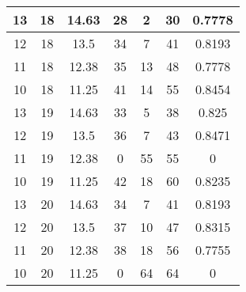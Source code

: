 \documentclass[letterpaper, 12pt]{article}
\begin{document}
\begin{longtable}{|c|c|c|c|c|c|c|}
\hline
13 & 18 & 14.63 & 28 & 2 & 30 & 0.7778 \\
\hline
12 & 18 & 13.5 & 34 & 7 & 41 & 0.8193 \\
\hline
11 & 18 & 12.38 & 35 & 13 & 48 & 0.7778 \\
\hline
10 & 18 & 11.25 & 41 & 14 & 55 & 0.8454 \\
\hline
13 & 19 & 14.63 & 33 & 5 & 38 & 0.825 \\
\hline
12 & 19 & 13.5 & 36 & 7 & 43 & 0.8471 \\
\hline
11 & 19 & 12.38 & 0 & 55 & 55 & 0 \\
\hline
10 & 19 & 11.25 & 42 & 18 & 60 & 0.8235 \\
\hline
13 & 20 & 14.63 & 34 & 7 & 41 & 0.8193 \\
\hline
12 & 20 & 13.5 & 37 & 10 & 47 & 0.8315 \\
\hline
11 & 20 & 12.38 & 38 & 18 & 56 & 0.7755 \\
\hline
10 & 20 & 11.25 & 0 & 64 & 64 & 0 \\
\hline
\end{longtable}
\end{document}
